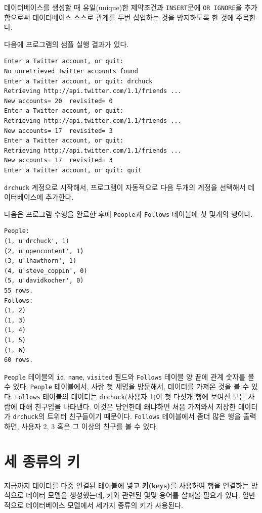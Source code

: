 데이터베이스를 생성할 때 유일(unique)한 제약조건과 {\tt INSERT}문에 {\tt OR IGNORE}을 추가함으로써 
데이터베이스 스스로 관계를 두번 삽입하는 것을 방지하도록 한 것에 주목한다.

다음에 프로그램의 샘플 실행 결과가 있다.

\beforeverb
\begin{verbatim}
Enter a Twitter account, or quit: 
No unretrieved Twitter accounts found
Enter a Twitter account, or quit: drchuck
Retrieving http://api.twitter.com/1.1/friends ...
New accounts= 20  revisited= 0
Enter a Twitter account, or quit: 
Retrieving http://api.twitter.com/1.1/friends ...
New accounts= 17  revisited= 3
Enter a Twitter account, or quit: 
Retrieving http://api.twitter.com/1.1/friends ...
New accounts= 17  revisited= 3
Enter a Twitter account, or quit: quit
\end{verbatim}
\afterverb
%

{\tt drchuck} 계정으로 시작해서, 프로그램이 자동적으로 다음 두개의 계정을 선택해서 데이터베이스에 추가한다.

다음은 프로그램 수행을 완료한 후에 {\tt People}과 {\tt Follows} 테이블에 첫 몇개의 행이다.

\beforeverb
\begin{verbatim}
People:
(1, u'drchuck', 1)
(2, u'opencontent', 1)
(3, u'lhawthorn', 1)
(4, u'steve_coppin', 0)
(5, u'davidkocher', 0)
55 rows.
Follows:
(1, 2)
(1, 3)
(1, 4)
(1, 5)
(1, 6)
60 rows.
\end{verbatim}
\afterverb
%

{\tt People} 테이블의 {\tt id}, {\tt name}, {\tt visited} 필드와 {\tt Follows} 테이블 양 끝에 관계 숫자를 볼 수 있다.
{\tt People} 테이블에서, 사람 첫 세명을 방문해서, 데이터를 가져온 것을 볼 수 있다.
{\tt Follows} 테이블의 데이터는 {\tt drchuck}(사용자 1)이 첫 다섯개 행에 보여진 모든 사람에 대해 친구임을 나타낸다.
이것은 당연한데 왜냐하면 처음 가져와서 저장한 데이터가 {\tt drchuck}의 트위터 친구들이기 때문이다.
{\tt Follows} 테이블에서 좀더 많은 행을 출력하면, 사용자 2, 3 혹은 그 이상의 친구를 볼 수 있다.

\section{세 종류의 키}

지금까지 데이터를 다중 연결된 테이블에 넣고 {\bf 키(keys)}를 사용하여 행을 연결하는 방식으로 데이터 모델을 생성했는데,
키와 관련된 몇몇 용어를 살펴볼 필요가 있다. 
일반적으로 데이터베이스 모델에서 세가지 종류의 키가 사용된다.

